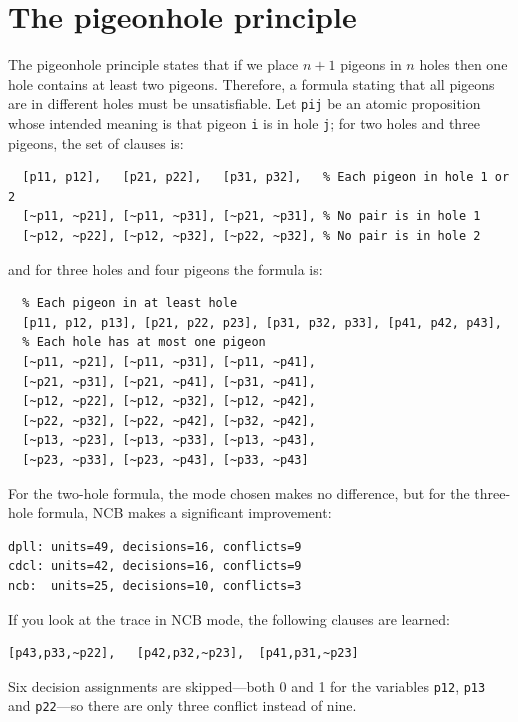 \documentclass[11pt]{report}
\newcommand*{\p}[1]{\textup{\texttt{#1}}}
\begin{document}
\clearpage

\chapter{The pigeonhole principle}\label{ch.pigeon}

The pigeonhole principle states that if we place $n+1$ pigeons in $n$
holes then one hole contains at least two pigeons. Therefore, a
formula stating that all pigeons are in different holes must be
unsatisfiable. Let \p{pij} be an atomic proposition whose intended
meaning is that pigeon \p{i} is in hole \p{j}; for two holes and three
pigeons, the set of clauses is:

\begin{verbatim}
  [p11, p12],   [p21, p22],   [p31, p32],   % Each pigeon in hole 1 or 2 
  [~p11, ~p21], [~p11, ~p31], [~p21, ~p31], % No pair is in hole 1
  [~p12, ~p22], [~p12, ~p32], [~p22, ~p32], % No pair is in hole 2
\end{verbatim}

and for three holes and four pigeons the formula is:

\begin{verbatim}
  % Each pigeon in at least hole
  [p11, p12, p13], [p21, p22, p23], [p31, p32, p33], [p41, p42, p43], 
  % Each hole has at most one pigeon
  [~p11, ~p21], [~p11, ~p31], [~p11, ~p41],
  [~p21, ~p31], [~p21, ~p41], [~p31, ~p41],
  [~p12, ~p22], [~p12, ~p32], [~p12, ~p42],
  [~p22, ~p32], [~p22, ~p42], [~p32, ~p42],
  [~p13, ~p23], [~p13, ~p33], [~p13, ~p43],
  [~p23, ~p33], [~p23, ~p43], [~p33, ~p43]
\end{verbatim}

For the two-hole formula, the mode chosen makes no difference, but for
the three-hole formula, NCB makes a significant improvement:

\begin{verbatim}
dpll: units=49, decisions=16, conflicts=9
cdcl: units=42, decisions=16, conflicts=9
ncb:  units=25, decisions=10, conflicts=3
\end{verbatim}

If you look at the trace in NCB mode, the following clauses are
learned:

\begin{verbatim}
[p43,p33,~p22],   [p42,p32,~p23],  [p41,p31,~p23]
\end{verbatim}

Six decision assignments are skipped---both 0 and 1 for the variables
\p{p12}, \p{p13} and \p{p22}---so there are only three conflict instead
of nine.
\end{document}
